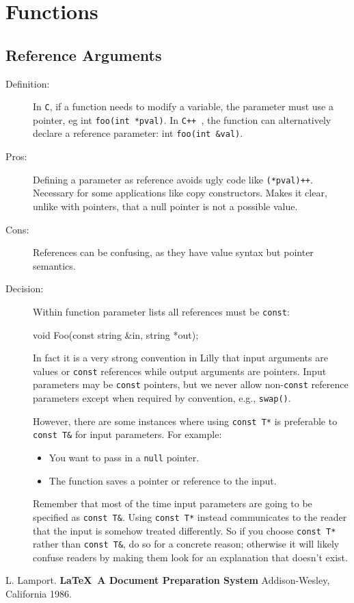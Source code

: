 \documentclass[12pt,reqno]{book}      %
\def\Cpp{\texttt{C++ }}
\begin{document}
\chapter{Functions}
\section{Reference Arguments}
\begin{description}
\item[Definition:] In \texttt{C}, if a function needs to modify a variable, the parameter must use a pointer, eg int \texttt{foo(int *pval)}. In \Cpp, the function can alternatively declare a reference parameter: int \texttt{foo(int \&val)}.
\item[Pros:] Defining a parameter as reference avoids ugly code like \texttt{(*pval)++}. Necessary for some applications like copy constructors. Makes it clear, unlike with pointers, that a null pointer is not a possible value.
\item[Cons:] 	References can be confusing, as they have value syntax but pointer semantics.
\item[Decision:] Within function parameter lists all references must be \texttt{const}:
\begin{Code}
void Foo(const string &in, string *out);
\end{Code}
In fact it is a very strong convention in Lilly that input arguments are values or \texttt{const} references while output arguments are pointers. Input parameters may be \texttt{const} pointers, but we never allow non-\texttt{const} reference parameters except when required by convention, e.g., \texttt{swap()}.

However, there are some instances where using \texttt{const T*} is preferable to \texttt{const T\&} for input parameters. For example:
\begin{itemize}
	\item You want to pass in a \texttt{null} pointer.
	\item The function saves a pointer or reference to the input.
\end{itemize}
Remember that most of the time input parameters are going to be specified as \texttt{const T\&}. Using \texttt{const T*} instead communicates to the reader that the input is somehow treated differently. So if you choose \texttt{const T*} rather than \texttt{const T\&}, do so for a concrete reason; otherwise it will likely confuse readers by making them look for an explanation that doesn't exist.
\end{description}	

%
%

\begin{thebibliography}{99}
 L. Lamport. {\bf \LaTeX \ A Document Preparation System}
Addison-Wesley, California 1986.
\end{thebibliography}


\end{document}

